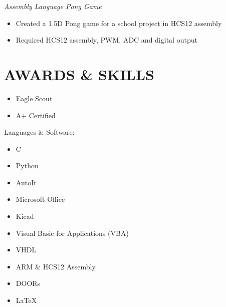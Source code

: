 \documentclass[line,margin]{res}
\begin{document}
\begin{resume}
	\vspace{-10pt}
	{\sl Assembly Language Pong Game}
		\begin{itemize} \itemsep -2pt
			\item Created a 1.5D Pong game for a school project in HCS12 assembly
			\item Required HCS12 assembly, PWM, ADC and digital output
		\end{itemize}
\section{AWARDS \& SKILLS } 
		\begin{multicols}{2}
			\begin{itemize}
				\itemsep -2pt
				\item[] Eagle Scout
				\item[] A+ Certified

			\end{itemize}
		\end{multicols}
	\vspace{-10pt}
	{Languages \& Software:} %
		\begin{multicols}{2}
			\begin{itemize}
				\itemsep -2pt
				\item[] C
				\item[] Python
				\item[] AutoIt
				\item[] Microsoft Office
				\item[] Kicad
				\item[] Visual Basic for Applications (VBA)
				\item[] VHDL
				\item[] ARM \& HCS12 Assembly
				\item[] DOORs
				\item[] \LaTeX 
			\end{itemize}
		\end{multicols}

\end{resume}
\end{document}
